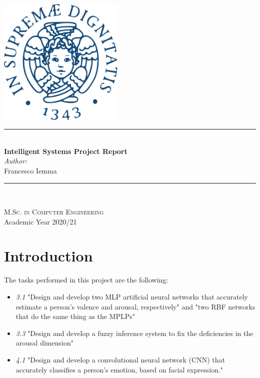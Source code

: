\documentclass[a4paper]{report}
\newcommand{\HRule}{\rule{\linewidth}{0.5mm}}
\begin{document}
	\begin{titlepage}
		\begin{center}
			
			\includegraphics[width=0.45\textwidth]{img/unipi.png}~\\[2.5cm]
			
			
			\HRule \\[0.4cm]
			{ \LARGE 
				\Huge\textbf{Intelligent Systems Project Report}\\[0.5cm]
				\LARGE\textit{Author:} \\[0.1cm]
				Francesco Iemma \\[0.1cm]
			}
			\HRule \\[1.5cm]
			
			
			
			{ \Large
			}
			
			\vfill
			
			\textsc{\large M.Sc. in Computer Engineering}\\[0.4cm]
			
			
			{\large Academic Year 2020/21}
			
		\end{center}
	\end{titlepage}
	
	
	\tableofcontents
	
	\chapter*{Introduction}
	The tasks performed in this project are the following:
	\begin{itemize}
		\item \textit{3.1} "Design and develop two MLP artificial neural networks that accurately estimate a person's valence and arousal, respectively" and "two RBF networks that do the same thing as the MPLPs"
		
		\item \textit{3.3} "Design and develop a fuzzy inference system to fix the deficiencies in the arousal dimension"
		
		\item \textit{4.1} "Design and develop a convolutional neural network (CNN) that accurately classifies a person's emotion, based on facial expression."
	\end{itemize}
\end{document}
